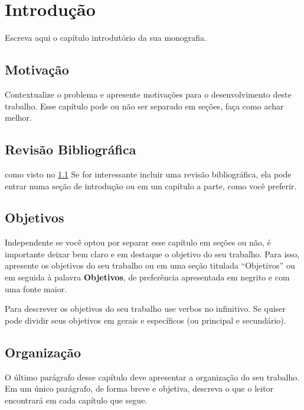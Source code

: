 \documentclass[12pt,a4paper,header]{abnt}
\begin{document}
\tableofcontents{}
\listoffigures
\listoftables



\chapter{Introdução} \label{cap:introducao}


Escreva aqui o capítulo introdutório da sua monografia. 

\section{Motivação} \label{sec:motiv}
Contextualize o problema e apresente motivações para o desenvolvimento deste trabalho. Esse capítulo pode ou não ser separado em seções, faça como achar melhor. 



\section{Revisão Bibliográfica}
como visto no \ref{sec:motiv}
Se for interessante incluir uma revisão bibliográfica, ela pode entrar numa seção de introdução ou em um capítulo a parte, como você preferir.  


\section{Objetivos}
Independente se você optou por separar esse capítulo em seções ou não, é importante deixar bem claro e em destaque o objetivo do seu trabalho. Para isso, apresente os objetivos do seu trabalho ou em uma seção titulada ``Objetivos'' ou em seguida à palavra \textbf{\large Objetivos}, de preferência apresentada em negrito e com uma fonte maior. 

Para descrever os objetivos do seu trabalho use verbos no infinitivo. Se quiser pode dividir seus objetivos em gerais e específicos (ou principal e secundário). 


\section{Organização}
O último parágrafo desse capítulo deve apresentar a organização do seu trabalho. Em um único parágrafo, de forma breve e objetiva, descreva o que o leitor encontrará em cada capítulo que segue.
\end{document}
